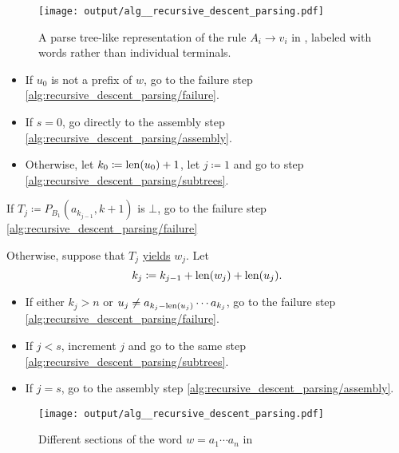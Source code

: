 \begin{algorithm}
\begin{thmenum}
    \begin{figure}[!ht]
      \centering
      \texttt{[image: output/alg\_\_recursive\_descent\_parsing.pdf]}
      \caption{A parse tree-like representation of the rule \( A_i \to v_i \) in , labeled with words rather than individual terminals.}
      \label{fig:alg:recursive_descent_parsing/rule}
    \end{figure}

    \begin{itemize}
      \item If \( u_0 \) is not a prefix of \( w \), go to the failure step \ref{alg:recursive_descent_parsing/failure}.
      \item If \( s = 0 \), go directly to the assembly step \ref{alg:recursive_descent_parsing/assembly}.
      \item Otherwise, let \( k_0 \coloneqq \operatorname{len}(u_0) + 1 \), let \( j \coloneqq 1 \) and go to step \ref{alg:recursive_descent_parsing/subtrees}.
    \end{itemize}

     If \( T_j \coloneqq P_{B_1}(a_{k_{j-1}}, k + 1) \) is \( \bot \), go to the failure step \ref{alg:recursive_descent_parsing/failure}

    Otherwise, suppose that \( T_j \) \hyperref[def:parse_tree_word]{yields} \( w_j \). Let
    \begin{equation*}
      k_j \coloneqq k_{j-1} + \operatorname{len}(w_j) + \operatorname{len}(u_j).
    \end{equation*}

    \begin{itemize}
      \item If either \( k_j > n \) or \( u_j \neq a_{k_j - \operatorname{len}(u_j)} \cdots a_{k_j} \), go to the failure step \ref{alg:recursive_descent_parsing/failure}.
      \item If \( j < s \), increment \( j \) and go to the same step \ref{alg:recursive_descent_parsing/subtrees}.
      \item If \( j = s \), go to the assembly step \ref{alg:recursive_descent_parsing/assembly}.
    \end{itemize}

    \begin{figure}[!ht]
      \centering
      \texttt{[image: output/alg\_\_recursive\_descent\_parsing.pdf]}
      \caption{Different sections of the word \( w = a_1 \cdots a_n \) in }
      \label{fig:alg:recursive_descent_parsing/subtrees}
    \end{figure}


\end{thmenum}
\end{algorithm}

